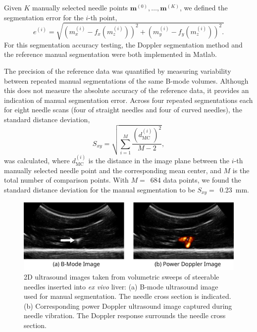 Given $K$ manually selected needle points $\bm{m}^{(0)}, \dotsc, \bm{m}^{(K)}$, we defined the segmentation error for the $i$-th point,
\begin{equation}
e^{(i)} = \sqrt{ \left(m_x^{(i)}-f_x(m_z^{(i)})\right)^2 + \left(m_y^{(i)}-f_y(m_z^{(i)})\right)^2.} 
\end{equation}
\noindent For this segmentation accuracy testing, the Doppler segmentation method and the reference manual segmentation were both implemented in Matlab.

The precision of the reference data was quantified by measuring variability between repeated manual segmentations of the same B-mode volumes. Although this does not measure the absolute accuracy of the reference data, it provides an indication of manual segmentation error. Across four repeated segmentations each for eight needle scans (four of straight needles and four of curved needles), the standard distance deviation, 
\begin{equation}
S_{xy} = \sqrt{      \sum_{i=1}^{M} \frac{(d^{(i)}_{\text{MC}})^2}{M-2}       },
\end{equation}
\noindent was calculated, where $d^{(i)}_{\text{MC}}$ is the distance in the image plane between the $i$-th manually selected needle point and the corresponding mean center, and $M$ is the total number of comparison points. With $M =$~684 data points, we found the standard distance deviation for the manual segmentation to be $S_{xy} =$~0.23~mm.
 
\begin{figure}[!t]
\centering
\includegraphics[width=\textwidth]{Images/Chapter2/2DUS/2DUS}%
\caption[2D ultrasound images from 3D sweeps of needle]{2D ultrasound images taken from volumetric sweeps of steerable needles inserted into \textit{ex vivo} liver: (a) B-mode ultrasound image used for manual segmentation. The needle cross section is indicated. (b) Corresponding power Doppler ultrasound image captured during needle vibration. The Doppler response surrounds the needle cross section.}
\label{fig:2DUS}
\end{figure} 

